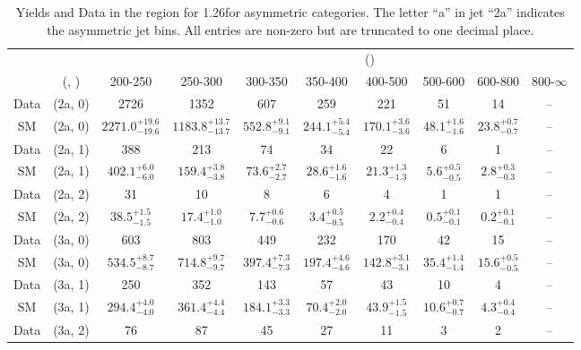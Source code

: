 \begin{table}[h!]
\tiny
\centering
\caption{Yields and Data in the \mj region for 1.26\ifb for asymmetric categories. The letter ``a'' in jet \eg ``2a''  indicates the asymmetric jet bins. All entries are non-zero but are truncated to one decimal place.\label{tab:yieldsall_mu_comb_asym}}
\begin{tabular}
{cccccccccc}
	\hline\hline
&	&	& \multicolumn{8}{c}{\scalht (\gev)}\\ 
	&	 (\njet, \nb) & 200-250 & 250-300 & 300-350 & 350-400 & 400-500 & 500-600 & 600-800 & 800-$\infty$ \\ [0.8ex] 
\hline
	Data & (2a, 0) & 2726 & 1352 & 607 & 259 & 221 & 51 & 14 & -- \\[0.5ex] 
	SM & (2a, 0) & $2271.0^{+ 19.6 }_{- 19.6 }$ & $1183.8^{+ 13.7 }_{- 13.7 }$ & $552.8^{+ 9.1 }_{- 9.1 }$ & $244.1^{+ 5.4 }_{- 5.4 }$ & $170.1^{+ 3.6 }_{- 3.6 }$ & $48.1^{+ 1.6 }_{- 1.6 }$ & $23.8^{+ 0.7 }_{- 0.7 }$ & -- \\[0.5ex] 
	Data & (2a, 1) & 388 & 213 & 74 & 34 & 22 & 6 & 1 & -- \\[0.5ex] 
	SM & (2a, 1) & $402.1^{+ 6.0 }_{- 6.0 }$ & $159.4^{+ 3.8 }_{- 3.8 }$ & $73.6^{+ 2.7 }_{- 2.7 }$ & $28.6^{+ 1.6 }_{- 1.6 }$ & $21.3^{+ 1.3 }_{- 1.3 }$ & $5.6^{+ 0.5 }_{- 0.5 }$ & $2.8^{+ 0.3 }_{- 0.3 }$ & -- \\[0.5ex] 
	Data & (2a, 2) & 31 & 10 & 8 & 6 & 4 & 1 & 1 & -- \\[0.5ex] 
	SM & (2a, 2) & $38.5^{+ 1.5 }_{- 1.5 }$ & $17.4^{+ 1.0 }_{- 1.0 }$ & $7.7^{+ 0.6 }_{- 0.6 }$ & $3.4^{+ 0.5 }_{- 0.5 }$ & $2.2^{+ 0.4 }_{- 0.4 }$ & $0.5^{+ 0.1 }_{- 0.1 }$ & $0.2^{+ 0.1 }_{- 0.1 }$ & -- \\[0.5ex] 
	Data & (3a, 0) & 603 & 803 & 449 & 232 & 170 & 42 & 15 & -- \\[0.5ex] 
	SM & (3a, 0) & $534.5^{+ 8.7 }_{- 8.7 }$ & $714.8^{+ 9.7 }_{- 9.7 }$ & $397.4^{+ 7.3 }_{- 7.3 }$ & $197.4^{+ 4.6 }_{- 4.6 }$ & $142.8^{+ 3.1 }_{- 3.1 }$ & $35.4^{+ 1.4 }_{- 1.4 }$ & $15.6^{+ 0.5 }_{- 0.5 }$ & -- \\[0.5ex] 
	Data & (3a, 1) & 250 & 352 & 143 & 57 & 43 & 10 & 4 & -- \\[0.5ex] 
	SM & (3a, 1) & $294.4^{+ 4.0 }_{- 4.0 }$ & $361.4^{+ 4.4 }_{- 4.4 }$ & $184.1^{+ 3.3 }_{- 3.3 }$ & $70.4^{+ 2.0 }_{- 2.0 }$ & $43.9^{+ 1.5 }_{- 1.5 }$ & $10.6^{+ 0.7 }_{- 0.7 }$ & $4.3^{+ 0.4 }_{- 0.4 }$ & -- \\[0.5ex] 
	Data & (3a, 2) & 76 & 87 & 45 & 27 & 11 & 3 & 2 & -- \\[0.5ex] 

\end{tabular}
\end{table}
